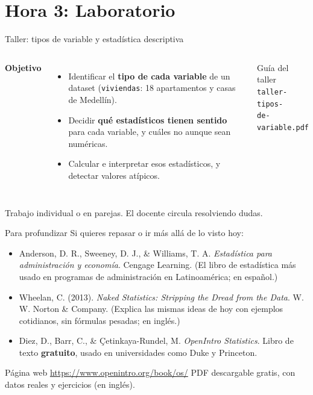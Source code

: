 \documentclass[aspectratio=169,11pt]{beamer}
\begin{document}
\section{Hora 3: Laboratorio}
\begin{frame}{Taller: tipos de variable y estadística descriptiva}
  \begin{columns}[T,onlytextwidth]
    \textbf{Objetivo}
    \begin{itemize}
      \small
      \item Identificar el \textbf{tipo de cada variable} de un dataset
        (\texttt{viviendas}: 18 apartamentos y casas de Medellín).
      \item Decidir \textbf{qué estadísticos tienen sentido} para cada
        variable, y cuáles no aunque sean numéricas.
      \item Calcular e interpretar esos estadísticos, y detectar valores
        atípicos.
    \end{itemize}
    \begin{exampleblock}{Guía del taller}
      \small \texttt{taller-tipos-}\\\texttt{de-variable.pdf}
    \end{exampleblock}
  \end{columns}
  \vspace{0.3cm}
  \small Trabajo individual o en parejas. El docente circula resolviendo dudas.
\end{frame}

\begin{frame}{Para profundizar}
  \small Si quieres repasar o ir más allá de lo visto hoy:
  \begin{itemize}
    \small
    \item Anderson, D. R., Sweeney, D. J., \& Williams, T. A.
      \textit{Estadística para administración y economía}. Cengage
      Learning. (El libro de estadística más usado en programas de
      administración en Latinoamérica; en español.)
    \item Wheelan, C. (2013). \textit{Naked Statistics: Stripping the
      Dread from the Data}. W. W. Norton \& Company. (Explica las mismas
      ideas de hoy con ejemplos cotidianos, sin fórmulas pesadas; en
      inglés.)
    \item Diez, D., Barr, C., \& Çetinkaya-Rundel, M. \textit{OpenIntro
      Statistics}. Libro de texto \textbf{gratuito}, usado en
      universidades como Duke y Princeton.
  \end{itemize}
  \begin{alertblock}{Página web}
    \small \url{https://www.openintro.org/book/os/} \quad PDF descargable
    gratis, con datos reales y ejercicios (en inglés).
  \end{alertblock}
\end{frame}
\end{document}
